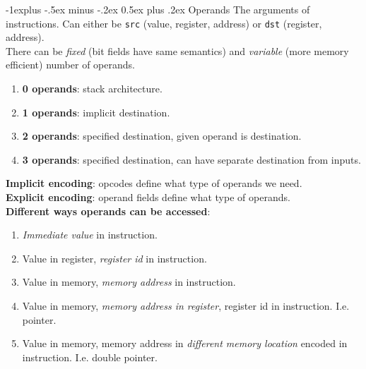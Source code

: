 \documentclass[10pt,landscape]{article}
\makeatletter
\renewcommand{\subsection}{\@startsection{subsection}{2}{0mm}%
                                {-1explus -.5ex minus -.2ex}%
                                {0.5ex plus .2ex}%
                                {\normalfont\scriptsize\bfseries}}
\makeatother
\begin{document}
\begin{multicols}{3}
\subsection{Operands}
The arguments of instructions. Can either be \texttt{src} (value, register, address) or \texttt{dst} (register, address).\\
There can be \textit{fixed} (bit fields have same semantics) and \textit{variable} (more memory efficient) number of operands. \\
\begin{enumerate}
\item \textbf{0 operands}: stack architecture.
\item \textbf{1 operands}: implicit destination.
\item \textbf{2 operands}: specified destination, given operand is destination.
\item \textbf{3 operands}: specified destination, can have separate destination from inputs.
\end{enumerate}
\textbf{Implicit encoding}: opcodes define what type of operands we need.\\
\textbf{Explicit encoding}: operand fields define what type of operands.\\
\textbf{Different ways operands can be accessed}:
\begin{enumerate}
\item \textit{Immediate value} in instruction.
\item Value in register, \textit{register id} in instruction.
\item Value in memory, \textit{memory address} in instruction.
\item Value in memory, \textit{memory address in register}, register id in instruction. I.e. pointer.
\item Value in memory, memory address in \textit{different memory location} encoded in instruction. I.e. double pointer.
\end{enumerate}

\end{multicols}
\end{document}
